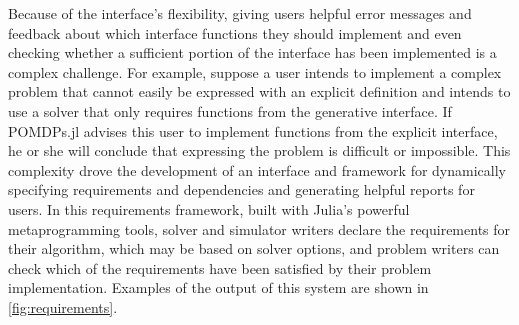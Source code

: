 Because of the interface's flexibility, giving users helpful error messages and feedback about which interface functions they should implement and even checking whether a sufficient portion of the interface has been implemented is a complex challenge.
For example, suppose a user intends to implement a complex problem that cannot easily be expressed with an explicit definition and intends to use a solver that only requires functions from the generative interface.
If POMDPs.jl advises this user to implement functions from the explicit interface, he or she will conclude that expressing the problem is difficult or impossible.
This complexity drove the development of an interface and framework for dynamically specifying requirements and dependencies and generating helpful reports for users.
In this requirements framework, built with Julia's powerful metaprogramming tools, solver and simulator writers declare the requirements for their algorithm, which may be based on solver options, and problem writers can check which of the requirements have been satisfied by their problem implementation.
Examples of the output of this system are shown in \cref{fig:requirements}.

%      

